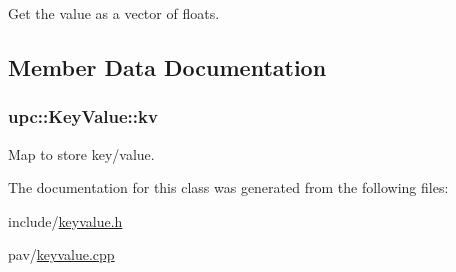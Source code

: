 Get the value as a vector of floats. 



\subsection{Member Data Documentation}
\subsubsection[{\texorpdfstring{kv}{kv}}]{ upc\+::\+Key\+Value\+::kv\hspace{0.3cm}{\ttfamily [private]}}\hypertarget{classupc_1_1KeyValue_a5a75d6c2fb82f07ba0798cfeceefff01}{}\label{classupc_1_1KeyValue_a5a75d6c2fb82f07ba0798cfeceefff01}


Map to store key/value. 



The documentation for this class was generated from the following files\+:\begin{DoxyCompactItemize}
\item 
include/\hyperlink{keyvalue_8h}{keyvalue.\+h}\item 
pav/\hyperlink{keyvalue_8cpp}{keyvalue.\+cpp}\end{DoxyCompactItemize}
